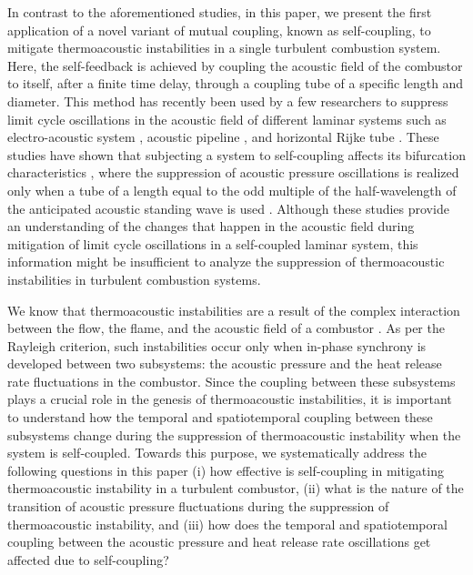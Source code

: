 \documentclass[%
preprint,
 amsmath,amssymb,
 aps,
 pra,
]{revtex4-2}
\begin{document}
In contrast to the aforementioned studies, in this paper, we present the first application of a novel variant of mutual coupling, known as self-coupling, to mitigate thermoacoustic instabilities in a single turbulent combustion system. Here, the self-feedback is achieved by coupling the acoustic field of the combustor to itself, after a finite time delay, through a coupling tube of a specific length and diameter. This method has recently been used by a few researchers to suppress limit cycle oscillations in the acoustic field of different laminar systems such as electro-acoustic system \cite{biwa2016suppression}, acoustic pipeline \cite{lato2019passive}, and horizontal Rijke tube \cite{srikanth2021selfcoupling}. These studies have shown that subjecting a system to self-coupling affects its bifurcation characteristics \cite{srikanth2021selfcoupling}, where the suppression of acoustic pressure oscillations is realized only when a tube of a length equal to the odd multiple of the half-wavelength of the anticipated acoustic standing wave is used \cite{biwa2016suppression, lato2019passive}. Although these studies provide an understanding of the changes that happen in the acoustic field during mitigation of limit cycle oscillations in a self-coupled laminar system, this information might be insufficient to analyze the suppression of thermoacoustic instabilities in turbulent combustion systems. 

We know that thermoacoustic instabilities are a result of the complex interaction between the flow, the flame, and the acoustic field of a combustor \cite{sujith2021thermoacoustic}. As per the Rayleigh criterion, such instabilities occur only when in-phase synchrony is developed between two subsystems: the acoustic pressure and the heat release rate fluctuations in the combustor. Since the coupling between these subsystems plays a crucial role in the genesis of thermoacoustic instabilities, it is important to understand how the temporal and spatiotemporal coupling between these subsystems change during the suppression of thermoacoustic instability when the system is self-coupled. Towards this purpose, we systematically address the following questions in this paper \textendash  \hspace{0.5} (i) how effective is self-coupling in mitigating thermoacoustic instability in a turbulent combustor, (ii) what is the nature of the transition of acoustic pressure fluctuations during the suppression of thermoacoustic instability, and (iii) how does the temporal and spatiotemporal coupling between the acoustic pressure and heat release rate oscillations get affected due to self-coupling? 
\end{document}
